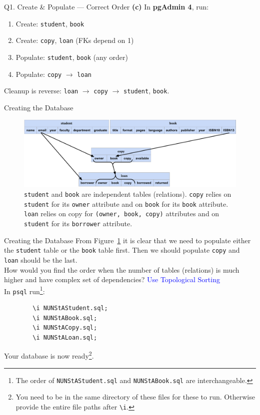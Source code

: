 \documentclass{beamer}
\begin{document}
\begin{frame}{Q1. Create \& Populate — Correct Order}
\textbf{(c)} In \textbf{pgAdmin 4}, run:
\begin{enumerate}
  \item Create: \texttt{student}, \texttt{book}
  \item Create: \texttt{copy}, \texttt{loan} (FKs depend on 1)
  \item Populate: \texttt{student}, \texttt{book} (any order)
  \item Populate: \texttt{copy} $\to$ \texttt{loan}
\end{enumerate}
Cleanup is reverse: \texttt{loan} $\to$ \texttt{copy} $\to$ \texttt{student}, \texttt{book}.
\end{frame}

\begin{frame}[fragile]{Creating the Database}
    \begin{figure}
        \centering
        \includegraphics[width=1\linewidth]{schema_t6.pdf}
        \caption{\texttt{student} and \texttt{book} are independent tables (relations). \texttt{copy} relies on \texttt{student} for its \texttt{owner} attribute and on \texttt{book} for its \texttt{book} attribute. \texttt{loan} relies on copy for \texttt{(owner, book, copy)} attributes and on \texttt{student} for its \texttt{borrower} attribute.}
        \label{fig:depend}
    \end{figure}
\end{frame}

\begin{frame}[fragile]{Creating the Database}
    From Figure~\ref{fig:depend} it is clear that we need to populate either the \texttt{student} table or the \texttt{book} table first. Then we should populate \texttt{copy} and \texttt{loan} should be the last. \\
    \pause
    \scriptsize
    \alert{How would you find the order when the number of tables (relations) is much higher and have complex set of dependencies?} \pause \textcolor{blue}{Use Topological Sorting}\\
    \pause
    \normalsize
    In \texttt{psql} run\footnote{The order of \texttt{NUNStAStudent.sql} and \texttt{NUNStABook.sql} are interchangeable.}:
    \begin{lstlisting}
        \i NUNStAStudent.sql;
        \i NUNStABook.sql;
        \i NUNStACopy.sql;
        \i NUNStALoan.sql;
    \end{lstlisting}
Your database is now ready\footnote{You need to be in the same directory of these files for these to run. Otherwise provide the entire file paths after \texttt{\textbackslash i}.}.\\
\end{frame}
\end{document}
